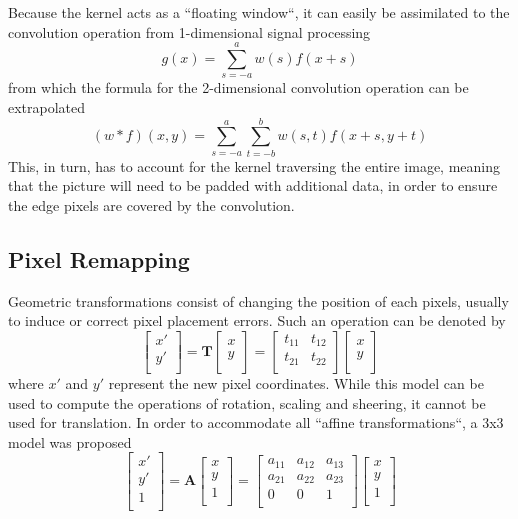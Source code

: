 Because the kernel acts as a ``floating window``, it can easily be assimilated to the convolution operation
from 1-dimensional signal processing \cite{dipBook}
\[g(x) = \sum_{s=-a}^{a} w(s)f(x+s)\]
from which
the formula for the 2-dimensional convolution operation \cite{dipBook} can be extrapolated 
\[(w*f)(x, y) = \sum_{s=-a}^{a}	\sum_{t=-b}^{b} w(s, t)f(x + s, y + t)\] 
This, in turn, has to account for the kernel
traversing the entire image, meaning that the picture will need to be padded with additional data, in order to
ensure the edge pixels are covered by the convolution.

\subsection{Pixel Remapping}

Geometric transformations consist of changing the position of each pixels, usually to induce or correct pixel
placement errors. Such an operation can be denoted \cite{dipBook} by
\[
	\begin{bmatrix}
		x' \\
		y' \\
	\end{bmatrix}
	=
	\mathbf{T}
	\begin{bmatrix}
		x \\
		y \\
	\end{bmatrix}
	=
	\begin{bmatrix}
		t_11 & t_12 \\
		t_21 & t_22 \\
	\end{bmatrix}
	\begin{bmatrix}
		x \\
		y \\
	\end{bmatrix}
\]
where \(x'\) and \(y'\) represent the new pixel coordinates. While this model can be used to compute the
operations of rotation, scaling and sheering, it cannot be used for translation. In order to accommodate
all ``affine transformations``, a 3x3 model \cite{dipBook} was proposed
\[
	\begin{bmatrix}
		x' \\
		y' \\
		1  \\
	\end{bmatrix}
	=
	\mathbf{A}
	\begin{bmatrix}
		x \\
		y \\
		1 \\
	\end{bmatrix}
	=
	\begin{bmatrix}
		a_11 & a_12 & a_13 \\
		a_21 & a_22 & a_23 \\
		0    & 0    & 1    \\
	\end{bmatrix}
	\begin{bmatrix}
		x \\
		y \\
		1 \\
	\end{bmatrix}
\]

